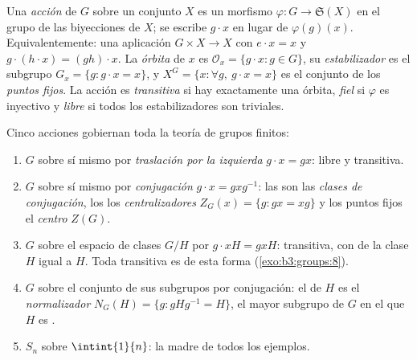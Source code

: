 \begin{definition}\label{def:b3:groups:action}
Una \emph{acción} de $G$ sobre un conjunto $X$ es
un morfismo $\varphi \colon G \to \mathfrak{S}(X)$ en el grupo de las
biyecciones de $X$; se escribe $g \cdot x$ en lugar de $\varphi(g)(x)$.
Equivalentemente: una aplicación $G \times X \to X$ con $e \cdot x = x$
y $g
\cdot (h \cdot x) = (gh) \cdot x$. La \emph{órbita} de $x$
es $\mathcal O_x = \{g \cdot x : g \in G\}$, su
\emph{estabilizador} es el subgrupo $G_x = \{g :
g\cdot x = x\}$, y $X^G = \{x : \forall g,\ g \cdot x = x\}$ es el
conjunto de los \emph{puntos fijos}. La acción es \emph{transitiva} si
hay exactamente una órbita, \emph{fiel} si $\varphi$ es inyectivo y
\emph{libre} si todos los estabilizadores son triviales.
\end{definition}

\begin{example}\label{ex:b3:groups:actions}
Cinco acciones gobiernan toda la teoría
de grupos finitos:
\begin{enumerate}
  \item $G$ sobre sí mismo por \emph{traslación por la izquierda}
  $g \cdot x = gx$: libre y transitiva. \item $G$ sobre sí mismo por
  \emph{conjugación} $g \cdot x = gxg^{-1}$: las
   son las \emph{clases de
  conjugación}, los
   los
  \emph{centralizadores} 
  $Z_G(x) = \{g : gx = xg\}$ y los puntos fijos el
  \emph{centro} $Z(G)$. \item $G$ sobre el espacio de
  clases $G/H$ por $g \cdot xH = gxH$: transitiva, con
   de la clase $H$ igual a
  $H$. Toda  transitiva es de esta
  forma
        (\cref{exo:b3:groups:8}).
  \item $G$ sobre el conjunto de sus subgrupos por conjugación: el
   de $H$ es el
  \emph{normalizador} $N_G(H) =
        \{g : gHg^{-1} = H\}$, el mayor subgrupo de $G$ en el que $H$ es
  . \item $S_n$ sobre
  $\intint{1}{n}$: la madre de todos los ejemplos.
\end{enumerate}
\end{example}

